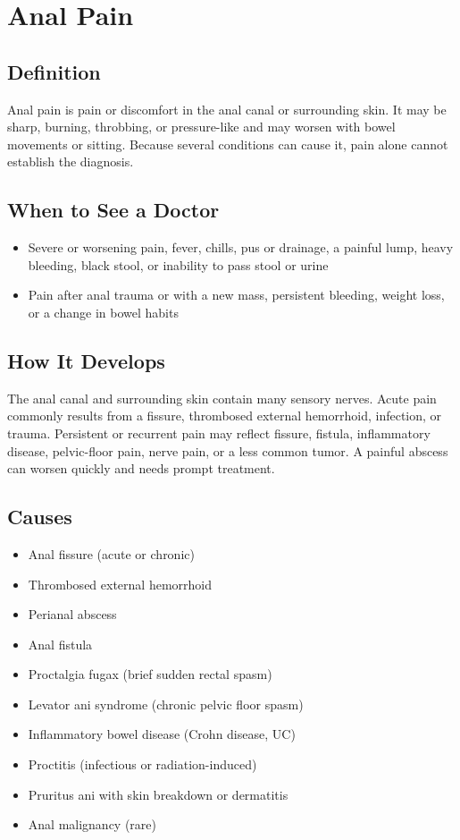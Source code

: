 \chapter{Anal Pain}

\section*{Definition}
Anal pain is pain or discomfort in the anal canal or surrounding skin. It may be sharp, burning, throbbing, or pressure-like and may worsen with bowel movements or sitting. Because several conditions can cause it, pain alone cannot establish the diagnosis.

\section*{When to See a Doctor}

\begin{itemize}
 \item Severe or worsening pain, fever, chills, pus or drainage, a painful lump, heavy bleeding, black stool, or inability to pass stool or urine
 \item Pain after anal trauma or with a new mass, persistent bleeding, weight loss, or a change in bowel habits
\end{itemize}

\section*{How It Develops}
The anal canal and surrounding skin contain many sensory nerves. Acute pain commonly results from a fissure, thrombosed external hemorrhoid, infection, or trauma. Persistent or recurrent pain may reflect fissure, fistula, inflammatory disease, pelvic-floor pain, nerve pain, or a less common tumor. A painful abscess can worsen quickly and needs prompt treatment.

\section*{Causes}
\begin{itemize}
 \item Anal fissure (acute or chronic)
 \item Thrombosed external hemorrhoid
 \item Perianal abscess
 \item Anal fistula
 \item Proctalgia fugax (brief sudden rectal spasm)
 \item Levator ani syndrome (chronic pelvic floor spasm)
 \item Inflammatory bowel disease (Crohn disease, UC)
 \item Proctitis (infectious or radiation-induced)
 \item Pruritus ani with skin breakdown or dermatitis
 \item Anal malignancy (rare)
\end{itemize}

